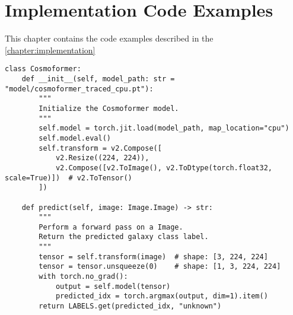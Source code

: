 
%






\chapter{Implementation Code Examples}
\label{ap:code-examples}

This chapter contains the code examples described in the \autoref{chapter:implementation}

\begin{samepage}
\begin{lstlisting}[style=mypython, caption={Cosmoformer class code example}, label={lst:be-model}]
class Cosmoformer:
    def __init__(self, model_path: str = "model/cosmoformer_traced_cpu.pt"):
        """
        Initialize the Cosmoformer model.
        """
        self.model = torch.jit.load(model_path, map_location="cpu")
        self.model.eval()
        self.transform = v2.Compose([
            v2.Resize((224, 224)),
            v2.Compose([v2.ToImage(), v2.ToDtype(torch.float32, scale=True)])  # v2.ToTensor()
        ])

    def predict(self, image: Image.Image) -> str:
        """
        Perform a forward pass on a Image.
        Return the predicted galaxy class label.
        """
        tensor = self.transform(image)  # shape: [3, 224, 224]
        tensor = tensor.unsqueeze(0)    # shape: [1, 3, 224, 224]
        with torch.no_grad():
            output = self.model(tensor)
            predicted_idx = torch.argmax(output, dim=1).item()
        return LABELS.get(predicted_idx, "unknown")
\end{lstlisting}
\end{samepage}

